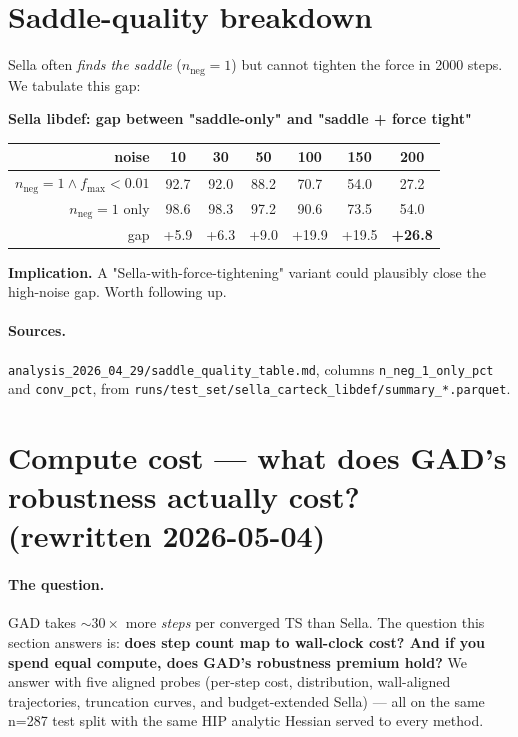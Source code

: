 \documentclass[11pt]{article}
\begin{document}
\newpage
\section{Saddle-quality breakdown}

Sella often \emph{finds the saddle} ($n_{\text{neg}}{=}1$) but cannot
tighten the force in 2000 steps. We tabulate this gap:

\begin{center}
\textbf{Sella libdef: gap between "saddle-only" and "saddle + force tight"} \\[0.3em]
\begin{tabular}{r|cccccc}
\toprule
noise & 10 & 30 & 50 & 100 & 150 & 200 \\
\midrule
$n_{\text{neg}}{=}1 \wedge f_{\max}{<}0.01$ & 92.7 & 92.0 & 88.2 & 70.7 & 54.0 & 27.2 \\
$n_{\text{neg}}{=}1$ only                  & 98.6 & 98.3 & 97.2 & 90.6 & 73.5 & 54.0 \\
gap                                         & +5.9 & +6.3 & +9.0 & +19.9 & +19.5 & \textbf{+26.8} \\
\bottomrule
\end{tabular}
\end{center}

\textbf{Implication.} A "Sella-with-force-tightening" variant could
plausibly close the high-noise gap. Worth following up.

\paragraph{Sources.} \texttt{analysis\_2026\_04\_29/saddle\_quality\_table.md},
columns \texttt{n\_neg\_1\_only\_pct} and \texttt{conv\_pct}, from
\texttt{runs/test\_set/sella\_carteck\_libdef/summary\_*.parquet}.

\newpage
\section{Compute cost — what does GAD's robustness actually cost? (rewritten 2026-05-04)}
\label{sec:compute}

\paragraph{The question.} GAD takes $\sim\!30\times$ more \emph{steps} per
converged TS than Sella. The question this section answers is:
\textbf{does step count map to wall-clock cost? And if you spend equal
compute, does GAD's robustness premium hold?} We answer with five
aligned probes (per-step cost, distribution, wall-aligned trajectories,
truncation curves, and budget-extended Sella) — all on the same n=287
test split with the same HIP analytic Hessian served to every method.
\end{document}
